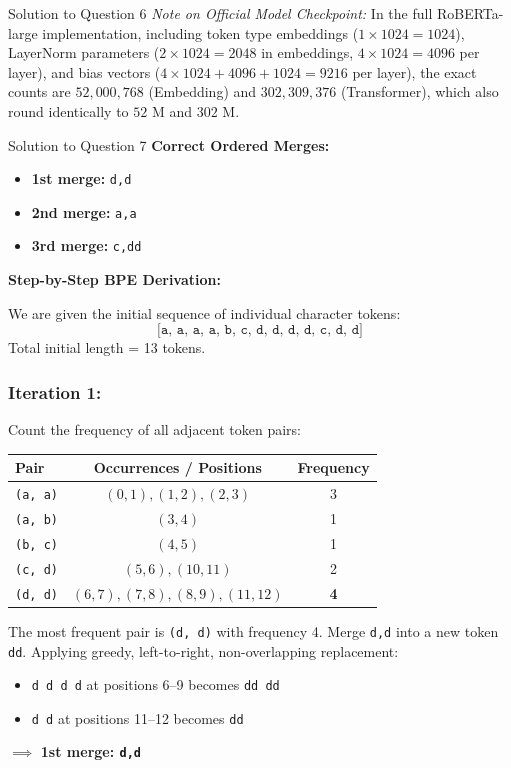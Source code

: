 \documentclass[11pt,a4paper]{article}
\begin{document}
\begin{solutionbox}{Solution to Question 6}
\medskip
\textit{Note on Official Model Checkpoint:} In the full RoBERTa-large implementation, including token type embeddings ($1 \times 1024 = 1024$), LayerNorm parameters ($2 \times 1024 = 2048$ in embeddings, $4 \times 1024 = 4096$ per layer), and bias vectors ($4 \times 1024 + 4096 + 1024 = 9216$ per layer), the exact counts are $52,000,768$ (Embedding) and $302,309,376$ (Transformer), which also round identically to $52\text{ M}$ and $302\text{ M}$.
\end{solutionbox}

\bigskip

\begin{solutionbox}{Solution to Question 7}
\textbf{Correct Ordered Merges:}
\begin{itemize}
    \item \textbf{1st merge:} \texttt{d,d}
    \item \textbf{2nd merge:} \texttt{a,a}
    \item \textbf{3rd merge:} \texttt{c,dd}
\end{itemize}

\medskip
\textbf{Step-by-Step BPE Derivation:}

We are given the initial sequence of individual character tokens:
\[
\texttt{[a, a, a, a, b, c, d, d, d, d, c, d, d]}
\]
Total initial length = 13 tokens.

\subsubsection*{Iteration 1:}
Count the frequency of all adjacent token pairs:
\begin{center}
\begin{tabular}{lcc}
\toprule
\textbf{Pair} & \textbf{Occurrences / Positions} & \textbf{Frequency} \\
\midrule
\texttt{(a, a)} & $(0,1), (1,2), (2,3)$ & 3 \\
\texttt{(a, b)} & $(3,4)$ & 1 \\
\texttt{(b, c)} & $(4,5)$ & 1 \\
\texttt{(c, d)} & $(5,6), (10,11)$ & 2 \\
\texttt{(d, d)} & $(6,7), (7,8), (8,9), (11,12)$ & \textbf{4} \\
\bottomrule
\end{tabular}
\end{center}
The most frequent pair is \texttt{(d, d)} with frequency 4.
Merge \texttt{d,d} into a new token \texttt{dd}.
Applying greedy, left-to-right, non-overlapping replacement:
\begin{itemize}
    \item \texttt{d d d d} at positions 6--9 becomes \texttt{dd dd}
    \item \texttt{d d} at positions 11--12 becomes \texttt{dd}
\end{itemize}
$\implies$ \textbf{1st merge: \texttt{d,d}}


\end{solutionbox}
\end{document}
